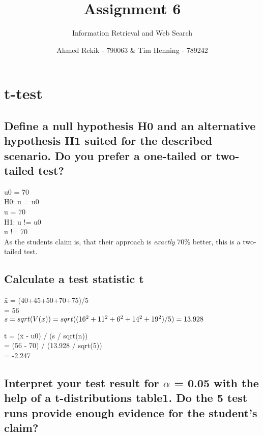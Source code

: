 \documentclass{scrartcl}
\title{Assignment 6}
\subtitle{Information Retrieval and Web Search}
\author{Ahmed Rekik - 790063 \& Tim Henning - 789242}
\begin{document}
\maketitle

\setcounter{section}{0}
\section{t-test}

\subsection{Define a null hypothesis H0 and an alternative hypothesis H1 suited for the described scenario. Do you prefer a one-tailed or two-tailed test?}

u0 = 70\\

H0: u = u0\\
    u = 70\\

H1: u != u0\\
    u != 70\\

As the students claim is, that their approach is \textit{exactly} 70\% better, this is a two-tailed test.


\subsection{Calculate a test statistic t}

\={x} = (40+45+50+70+75)/5\\
      = 56\\

$s = sqrt(V(x))\\
  = sqrt((16^{2}+11^{2}+6^{2}+14^{2}+19^{2})/5)\\
  = 13.928\\
$

t = (\={x} - u0) / (s / sqrt(n))\\
  = (56 - 70) / (13.928 / sqrt(5))\\
  = -2.247\\
  
\subsection{Interpret your test result for $\alpha$ = 0.05 with the help of a t-distributions table1. Do the 5 test runs provide enough evidence for the student’s claim?}
\end{document}
